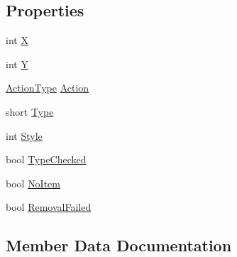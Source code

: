 \subsection*{Properties}
\begin{DoxyCompactItemize}
\item 
int \hyperlink{struct_o_t_a_1_1_plugin_1_1_hook_args_1_1_player_world_alteration_a460dbb2ba6e3570ffb2fc56f9dab0952}{X}
\item 
int \hyperlink{struct_o_t_a_1_1_plugin_1_1_hook_args_1_1_player_world_alteration_a7b27ffaf74eb118c6615676880313a72}{Y}
\item 
\hyperlink{namespace_o_t_a_1_1_i_d_a57decdbefe599cd02efcf8605eccec21}{Action\+Type} \hyperlink{struct_o_t_a_1_1_plugin_1_1_hook_args_1_1_player_world_alteration_ab673355ec0d420e5b106f21693f7b870}{Action}
\item 
short \hyperlink{struct_o_t_a_1_1_plugin_1_1_hook_args_1_1_player_world_alteration_a9ad169e9cb342d76c8ab378bab3cc6b3}{Type}
\item 
int \hyperlink{struct_o_t_a_1_1_plugin_1_1_hook_args_1_1_player_world_alteration_ac8655ffc6ca7d15f0f609dbe3ad926e1}{Style}
\item 
bool \hyperlink{struct_o_t_a_1_1_plugin_1_1_hook_args_1_1_player_world_alteration_ac9cdfc58acf049b0874116ded47cd016}{Type\+Checked}
\item 
bool \hyperlink{struct_o_t_a_1_1_plugin_1_1_hook_args_1_1_player_world_alteration_aefc215fd10ebb7955e7f7d49000f37ae}{No\+Item}
\item 
bool \hyperlink{struct_o_t_a_1_1_plugin_1_1_hook_args_1_1_player_world_alteration_aae11f6135ecebf6b287f3fb6f452e7f8}{Removal\+Failed}
\end{DoxyCompactItemize}


\subsection{Member Data Documentation}
\hypertarget{struct_o_t_a_1_1_plugin_1_1_hook_args_1_1_player_world_alteration_a419d6f4d87d99c773ff5e50785de58e9}{}
